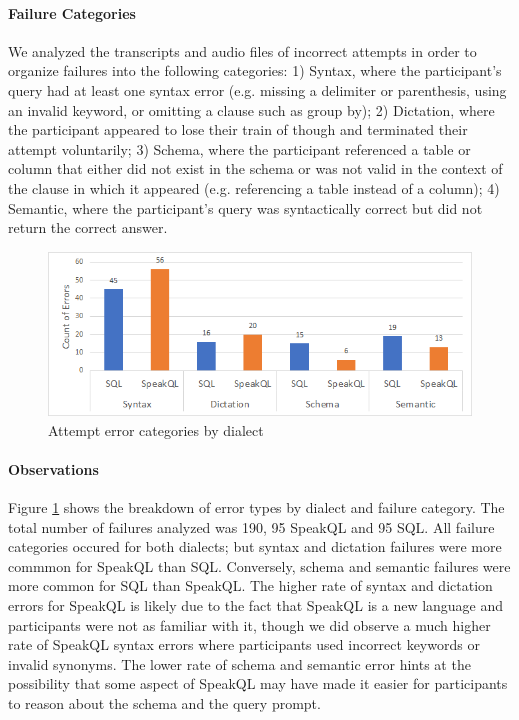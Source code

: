 \paragraph{\textbf{Failure Categories}}
We analyzed the transcripts and audio files of incorrect attempts in order to organize failures into the following categories: 1) Syntax, where the participant's query had at least one syntax error (e.g. missing a delimiter or parenthesis, using an invalid keyword, or omitting a clause such as group by); 2) Dictation, where the participant appeared to lose their train of though and terminated their attempt voluntarily; 3) Schema, where the participant referenced a table or column that either did not exist in the schema or was not valid in the context of the clause in which it appeared (e.g. referencing a table instead of a column); 4) Semantic, where the participant's query was syntactically correct but did not return the correct answer.

\begin{figure}
  \centering
  \includegraphics[width=0.8\linewidth]{figures/error-type-counts.png}
  \caption{Attempt error categories by dialect}
  \label{fig:errorcounts}
\end{figure}
\paragraph{\textbf{Observations}}

Figure \ref{fig:errorcounts} shows the breakdown of error types by dialect and failure category. The total number of failures analyzed was 190, 95 SpeakQL and 95 SQL. All failure categories occured for both dialects; but syntax and dictation failures were more commmon for SpeakQL than SQL. Conversely, schema and semantic failures were more common for SQL than SpeakQL. The higher rate of syntax and dictation errors for SpeakQL is likely due to the fact that SpeakQL is a new language and participants were not as familiar with it, though we did observe a much higher rate of SpeakQL syntax errors where participants used incorrect keywords or invalid synonyms. The lower rate of schema and semantic error hints at the possibility that some aspect of SpeakQL may have made it easier for participants to reason about the schema and the query prompt.



